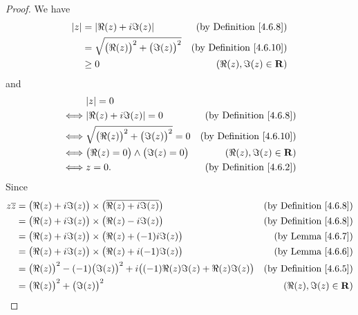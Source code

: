 \begin{proof}
    We have
    \begin{align*}
        \left\lvert z\right\rvert & = \left\lvert\Re(z) + i \Im(z)\right\rvert                        & \text{(by Definition \ref{4.6.8})}  \\
                & = \sqrt{\big(\Re(z)\big)^2 + \big(\Im(z)\big)^2} & \text{(by Definition \ref{4.6.10})} \\
                & \geq 0                                           & (\Re(z), \Im(z) \in \mathbf{R})
    \end{align*}
    and
    \begin{align*}
             & \abs{z} = 0                                                                              \\
        \iff & \abs{\Re(z) + i \Im(z)} = 0                        & \text{(by Definition \ref{4.6.8})}  \\
        \iff & \sqrt{\big(\Re(z)\big)^2 + \big(\Im(z)\big)^2} = 0 & \text{(by Definition \ref{4.6.10})} \\
        \iff & \big(\Re(z) = 0\big) \land \big(\Im(z) = 0\big)    & (\Re(z), \Im(z) \in \R)             \\
        \iff & z = 0.                                             & \text{(by Definition \ref{4.6.2})}
    \end{align*}
    Since
    \begin{align*}
        z \overline{z} & = \big(\Re(z) + i \Im(z)\big) \times \big(\overline{\Re(z) + i \Im(z)}\big)                     & \text{(by Definition \ref{4.6.8})}      \\
                       & = \big(\Re(z) + i \Im(z)\big) \times \big(\Re(z) - i \Im(z)\big)                                & \text{(by Definition \ref{4.6.8})}      \\
                       & = \big(\Re(z) + i \Im(z)\big) \times \big(\Re(z) + (-1) i \Im(z)\big)                           & \text{(by Lemma \ref{4.6.7})}           \\
                       & = \big(\Re(z) + i \Im(z)\big) \times \big(\Re(z) + i (-1) \Im(z)\big)                           & \text{(by Lemma \ref{4.6.6})}           \\
                       & = \big(\Re(z)\big)^2 - (-1) \big(\Im(z)\big)^2 + i \big((-1) \Re(z) \Im(z) + \Re(z) \Im(z)\big) & \text{(by Definition \ref{4.6.5})}      \\
                       & = \big(\Re(z)\big)^2 + \big(\Im(z)\big)^2                                                       & (\Re(z), \Im(z) \in \R)                 \\

\end{align*}
\end{proof}
